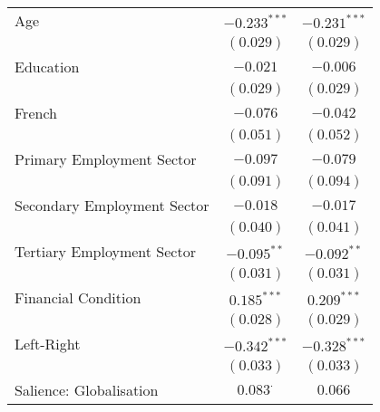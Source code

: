\begin{center}
\begin{tiny}
\begin{longtable}{l@{} c@{} c@{}}
\quad Age                                                                   & $-0.233^{***}$   & $-0.231^{***}$   \\
                                                                            & $(0.029)$        & $(0.029)$        \\
\quad Education                                                             & $-0.021$         & $-0.006$         \\
                                                                            & $(0.029)$        & $(0.029)$        \\
\quad French                                                                & $-0.076$         & $-0.042$         \\
                                                                            & $(0.051)$        & $(0.052)$        \\
\quad Primary Employment Sector                                             & $-0.097$         & $-0.079$         \\
                                                                            & $(0.091)$        & $(0.094)$        \\
\quad Secondary Employment Sector                                           & $-0.018$         & $-0.017$         \\
                                                                            & $(0.040)$        & $(0.041)$        \\
\quad Tertiary Employment Sector                                            & $-0.095^{**}$    & $-0.092^{**}$    \\
                                                                            & $(0.031)$        & $(0.031)$        \\
\quad Financial Condition                                                   & $0.185^{***}$    & $0.209^{***}$    \\
                                                                            & $(0.028)$        & $(0.029)$        \\
\quad Left-Right                                                            & $-0.342^{***}$   & $-0.328^{***}$   \\
                                                                            & $(0.033)$        & $(0.033)$        \\
\quad Salience: Globalisation                                               & $0.083^{\cdot}$  & $0.066$          \\

\end{longtable}
\end{tiny}
\end{center}
